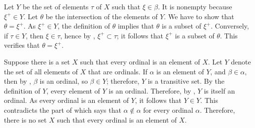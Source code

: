 \documentclass{article}
\begin{document}
\begin{solution}[\ref{exe:ddc4bdfk}]
  \label{sol:knjkxl0v}
  Let \(Y\) be the set of elements \(\tau\) of \(X\) such that
  \(\xi \in \beta\).  It is nonempty because \(\xi^+ \in Y\).  Let
  \(\theta\) be the intersection of the elements of \(Y\).  We have to
  show that \(\theta = \xi^+\).  As \(\xi^+ \in Y\), the definition of
  \(\theta\) implies that \(\theta\) is a subset of \(\xi^+\).
  Conversely, if \(\tau \in Y\), then \(\xi \in \tau\), hence by
  , \(\xi^+ \subset \tau\); it follows that
  \(\xi^+\) is a subset of \(\theta\).  This verifies that
  \(\theta = \xi^+\).
\end{solution}

\begin{solution}[\ref{exe:9pk4eh7k}]
  \label{sol:s4fkzn20}
  Suppose there is a set \(X\) such that every ordinal is an element
  of \(X\).  Let \(Y\) denote the set of all elements of \(X\) that
  are ordinals.  If \(\alpha\) is an element of \(Y\), and
  \(\beta \in \alpha\), then by , \(\beta\) is an
  ordinal, so \(\beta \in Y\); therefore, \(Y\) is a transitive set.
  By the definition of \(Y\), every element of \(Y\) is an ordinal.
  Therefore, by , \(Y\) is itself an ordinal.  As
  every ordinal is an element of \(Y\), it follows that \(Y \in Y\).
  This contradicts the part of  which says that
  \(\alpha \notin \alpha\) for every ordinal \(\alpha\).  Therefore,
  there is no set \(X\) such that every ordinal is an element of
  \(X\).
\end{solution}
\end{document}
